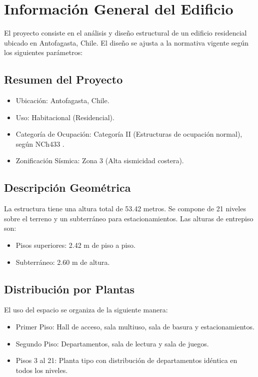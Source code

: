 \section{Información General del Edificio}

El proyecto consiste en el análisis y diseño estructural de un edificio residencial ubicado en Antofagasta, Chile. El diseño se ajusta a la normativa vigente según los siguientes parámetros:

\subsection{Resumen del Proyecto}
\begin{itemize}
    \item Ubicación: Antofagasta, Chile.
    \item Uso: Habitacional (Residencial).
    \item Categoría de Ocupación: Categoría II (Estructuras de ocupación normal), según NCh433 \cite{NCh433:1996}.
    \item Zonificación Sísmica: Zona 3 (Alta sismicidad costera).
\end{itemize}

\subsection{Descripción Geométrica}
La estructura tiene una altura total de 53.42 metros. Se compone de 21 niveles sobre el terreno y un subterráneo para estacionamientos. Las alturas de entrepiso son:
\begin{itemize}
    \item Pisos superiores: 2.42 m de piso a piso.
    \item Subterráneo: 2.60 m de altura.
\end{itemize}

\subsection{Distribución por Plantas}
El uso del espacio se organiza de la siguiente manera:
\begin{itemize}
    \item Primer Piso: Hall de acceso, sala multiuso, sala de basura y estacionamientos.
    \item Segundo Piso: Departamentos, sala de lectura y sala de juegos.
    \item Pisos 3 al 21: Planta tipo con distribución de departamentos idéntica en todos los niveles.
\end{itemize}

